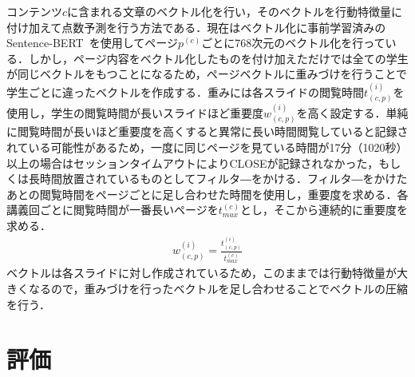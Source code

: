 \documentclass[platex,dvipdfmx,a4paper,twocolumn,base=10pt,jbase=10pt,ja=standard]{bxjsarticle}
\begin{document}


コンテンツ${c}$に含まれる文章のベクトル化を行い，そのベクトルを行動特徴量に付け加えて点数予測を行う方法である．現在はベクトル化に事前学習済みのSentence-BERT~\cite{sentence-BERT2019}を使用してページ${p^{(c)}}$ごとに768次元のベクトル化を行っている．しかし，ページ内容をベクトル化したものを付け加えただけでは全ての学生が同じベクトルをもつことになるため，ページベクトルに重みづけを行うことで学生ごとに違ったベクトルを作成する．重みには各スライドの閲覧時間$t^{(i)}_{(c,p)}$を使用し，学生の閲覧時間が長いスライドほど重要度$w^{(i)}_{(c,p)}$を高く設定する．単純に閲覧時間が長いほど重要度を高くすると異常に長い時間閲覧していると記録されている可能性があるため，一度に同じページを見ている時間が17分（1020秒）以上の場合はセッションタイムアウトによりCLOSEが記録されなかった，もしくは長時間放置されているものとしてフィルタ―をかける．フィルタ―をかけたあとの閲覧時間をページごとに足し合わせた時間を使用し，重要度を求める．各講義回ごとに閲覧時間が一番長いページを$t^{(c)}_{max}$とし，そこから連続的に重要度を求める．
\begin{align}
  w^{(i)}_{(c,p)} = \frac{t^{(i)}_{(c,p)}}{t^{(c)}_{max}}
\end{align}
ベクトルは各スライドに対し作成されているため，このままでは行動特徴量が大きくなるので，重みづけを行ったベクトルを足し合わせることでベクトルの圧縮を行う．








\section{評価}
\label{sec:evaluation}
\end{document}
